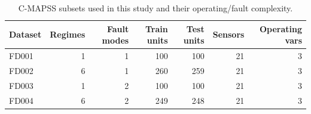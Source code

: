 \begin{table}[t]
\centering
\caption{C-MAPSS subsets used in this study and their operating/fault complexity.}
\label{tab:dataset_protocol}
\begin{tabular}{lrrrrrr}
\toprule
Dataset & Regimes & Fault modes & Train units & Test units & Sensors & Operating vars \\
\midrule
FD001 & 1 & 1 & 100 & 100 & 21 & 3 \\
FD002 & 6 & 1 & 260 & 259 & 21 & 3 \\
FD003 & 1 & 2 & 100 & 100 & 21 & 3 \\
FD004 & 6 & 2 & 249 & 248 & 21 & 3 \\
\bottomrule
\end{tabular}
\end{table}